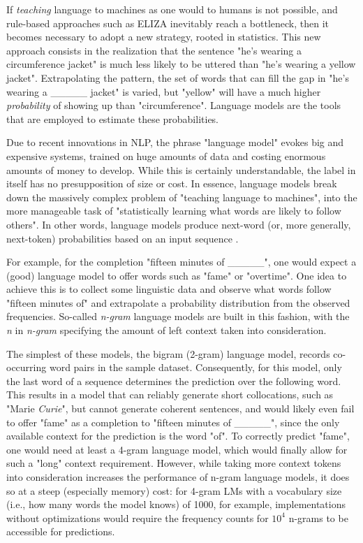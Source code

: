 If \emph{teaching} language to machines as one would to humans is not possible, and rule-based approaches such as ELIZA inevitably reach a bottleneck, then it becomes necessary to adopt a new strategy, rooted in statistics.
This new approach consists in the realization that the sentence "he's wearing a circumference jacket" is much less likely to be uttered than "he's wearing a yellow jacket".
Extrapolating the pattern, the set of words that can fill the gap in "he's wearing a \_\_\_\_\_ jacket" is varied, but "yellow" will have a much higher \emph{probability} of showing up than "circumference".
Language models are the tools that are employed to estimate these probabilities.

Due to recent innovations in NLP, the phrase "language model" evokes big and expensive systems, trained on huge amounts of data and costing enormous amounts of money to develop.
While this is certainly understandable, the label in itself has no presupposition of size or cost.
In essence, language models break down the massively complex problem of "teaching language to machines", into the more manageable task of "statistically learning what words are likely to follow others".
In other words, language models produce next-word (or, more generally, next-token) probabilities based on an input sequence \citep{citationneeded}.

For example, for the completion "fifteen minutes of \_\_\_\_\_", one would expect a (good) language model to offer words such as "fame" or "overtime".
One idea to achieve this is to collect some linguistic data and observe what words follow "fifteen minutes of" and extrapolate a probability distribution from the observed frequencies.
So-called \emph{n-gram} language models \citep{citationneeded} are built in this fashion, with the \emph{n} in \emph{n-gram} specifying the amount of left context taken into consideration.

The simplest of these models, the bigram (2-gram) language model, records co-occurring word pairs in the sample dataset.
Consequently, for this model, only the last word of a sequence determines the prediction over the following word.
This results in a model that can reliably generate short collocations, such as "Marie \emph{Curie}", but cannot generate coherent sentences, and would likely even fail to offer "fame" as a completion to "fifteen minutes of \_\_\_\_\_", since the only available context for the prediction is the word "of".
To correctly predict "fame", one would need at least a 4-gram language model, which would finally allow for such a "long" context requirement.
However, while taking more context tokens into consideration increases the performance of n-gram language models, it does so at a steep (especially memory) cost: for 4-gram LMs with a vocabulary size (i.e., how many words the model knows) of 1000, for example, implementations without optimizations would require the frequency counts for $10^{4}$ n-grams to be accessible for predictions.

